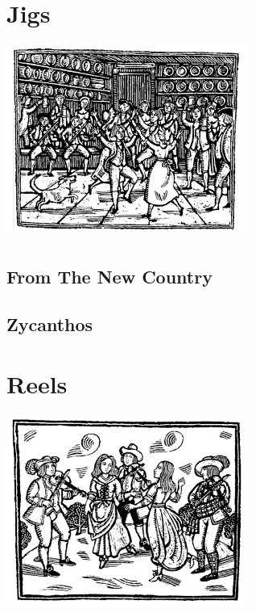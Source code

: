 \documentclass[12pt]{report}
\newcommand*{\cleartoleftpage}{%
  \clearpage
   \ifodd\value{page}\hbox{}\newpage\fi
}
\begin{document}
\tableofcontents
{} %

\cleartoleftpage
\chapter*{Jigs}
\begin{center}
\includegraphics[width=8cm]{../images/jigs}
\end{center}

\section*{From The New Country}


\cleartoleftpage
\section*{Zycanthos}


\cleartoleftpage
\chapter*{Reels}
\begin{center}
\includegraphics[width=8cm]{../images/reels}
\end{center}
\end{document}
